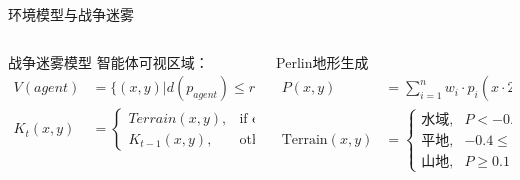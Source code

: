 \documentclass[
10pt,
aspectratio=169,
]{beamer}
\begin{document}
\begin{frame}{环境模型与战争迷雾}
    \begin{columns}
        \begin{column}{0.5\textwidth}
            \begin{exampleblock}{战争迷雾模型}
                智能体可视区域：
                \begin{align}
                V(agent) &= \{(x,y) | d(p_{agent}) \leq r_{vision}\} \\
                K_t(x,y) &= 
                \begin{cases}
                Terrain(x,y), & \text{if explored} \\
                K_{t-1}(x,y), & \text{otherwise}
                \end{cases}
                \end{align}
            \end{exampleblock}
        \end{column}
        \begin{column}{0.5\textwidth}
            \begin{alertblock}{Perlin地形生成}
                \begin{align}
                P(x,y) &= \sum_{i=1}^{n} w_i \cdot p_i(x \cdot 2^i, y \cdot 2^i) \\
                \text{Terrain}(x,y) &= 
                \begin{cases}
                \text{水域}, & P < -0.4 \\
                \text{平地}, & -0.4 \leq P < 0.1 \\
                \text{山地}, & P \geq 0.1
                \end{cases}
                \end{align}
            \end{alertblock}
        \end{column}
    \end{columns}
\end{frame}
\end{document}
